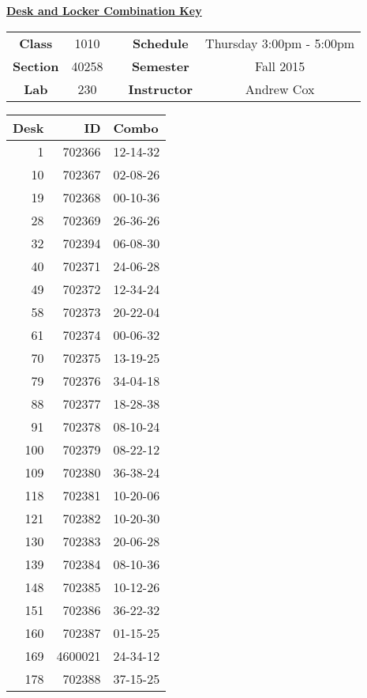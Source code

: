 \documentclass[12pt]{article}
\begin{document}
\thispagestyle{empty}

\begin{center}
	{\huge\textbf{\underline{ Desk and Locker Combination Key}}}
\end{center}


\begin{table}[h]
  \centering
  \begin{tabular}{ccccc}

  \textbf{Class} & 1010 & {\qquad} &\textbf{Schedule} & Thursday 3:00pm - 5:00pm \\
  \textbf{Section} & 40258 & {\qquad} & \textbf{Semester} & Fall 2015 \\
  \textbf{Lab} & 230 & {\qquad} & \textbf{Instructor} & Andrew Cox \\
  \end{tabular}
\end{table}
 \vspace{0.1in}
\begin{minipage}{0.4\textwidth}

\begin{tabular}{rrl}
\toprule
 Desk &       ID &     Combo \\
\midrule
    1 &   702366 &  12-14-32 \\
   10 &   702367 &  02-08-26 \\
   19 &   702368 &  00-10-36 \\
   28 &   702369 &  26-36-26 \\
   32 &   702394 &  06-08-30 \\
   40 &   702371 &  24-06-28 \\
   49 &   702372 &  12-34-24 \\
   58 &   702373 &  20-22-04 \\
   61 &   702374 &  00-06-32 \\
   70 &   702375 &  13-19-25 \\
   79 &   702376 &  34-04-18 \\
   88 &   702377 &  18-28-38 \\
   91 &   702378 &  08-10-24 \\
  100 &   702379 &  08-22-12 \\
  109 &   702380 &  36-38-24 \\
  118 &   702381 &  10-20-06 \\
  121 &   702382 &  10-20-30 \\
  130 &   702383 &  20-06-28 \\
  139 &   702384 &  08-10-36 \\
  148 &   702385 &  10-12-26 \\
  151 &   702386 &  36-22-32 \\
  160 &   702387 &  01-15-25 \\
  169 &  4600021 &  24-34-12 \\
  178 &   702388 &  37-15-25 \\
\bottomrule
\end{tabular}


\end{minipage}
\end{document}
